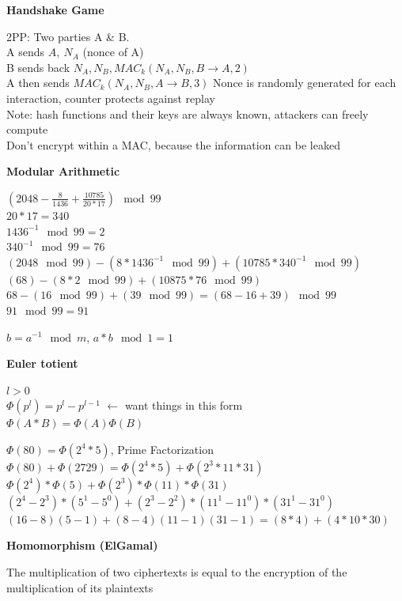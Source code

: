 \documentclass{article}
\begin{document}
\textbf{Handshake Game}

2PP: Two parties A \& B.\\
A sends $A,\ N_A$ (nonce of A)\\
B sends back $N_A,N_B,MAC_k(N_A,N_B,B\rightarrow A, 2)$\\
A then sends $MAC_k(N_A,N_B,A\rightarrow B, 3)$
Nonce is randomly generated for each interaction, counter protects against replay\\
Note: hash functions and their keys are always known, attackers can freely compute\\
Don't encrypt within a MAC, because the information can be leaked

\textbf{Modular Arithmetic}

$\left(2048-\frac{8}{1436}+\frac{10785}{20*17}\right)\mod 99$\\
$20*17=340$\\
$1436^{-1}\mod 99 = 2$\\
$340^{-1}\mod 99 = 76$\\
$(2048\mod 99)-(8*1436^{-1}\mod 99)+(10785*340^{-1}\mod 99)$\\
$(68)-(8*2\mod 99)+(10875*76\mod 99)$\\
$68-(16\mod 99)+(39\mod 99)=(68-16+39)\mod 99$\\
$91\mod 99 = 91$

$b=a^{-1}\mod m$, $a*b\mod 1 = 1$

\textbf{Euler totient}

$l>0$\\
$\Phi(p^l)=p^l-p^{l-1}$ $\leftarrow$ want things in this form\\
$\Phi(A*B)=\Phi(A)\Phi(B)$

$\Phi(80)=\Phi(2^4*5)$, Prime Factorization\\
$\Phi(80)+\Phi(2729)=\Phi(2^4*5)+\Phi(2^3*11*31)$\\
$\Phi(2^4)*\Phi(5)+\Phi(2^3)*\Phi(11)*\Phi(31)$\\
$(2^4-2^3)*(5^1-5^0)+(2^3-2^2)*(11^1-11^0)*(31^1-31^0)$\\
$(16-8)(5-1)+(8-4)(11-1)(31-1)=(8*4)+(4*10*30)$

\textbf{Homomorphism (ElGamal)}

The multiplication of two ciphertexts is equal to the encryption of the multiplication of its plaintexts
\end{document}

